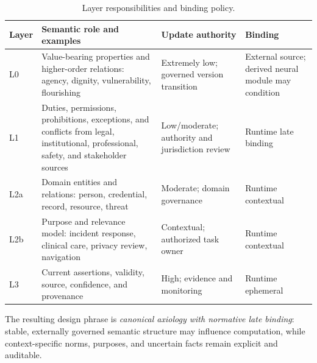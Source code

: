 \begin{table}[t]
\centering
\scriptsize
\caption{Layer responsibilities and binding policy.}
\label{tab:layers}
\renewcommand{\arraystretch}{1.15}
\setlength{\tabcolsep}{3pt}
\begin{tabularx}{\linewidth}{@{}>{\raggedright\arraybackslash}p{0.85cm}>{\raggedright\arraybackslash}X>{\raggedright\arraybackslash}p{2.1cm}>{\raggedright\arraybackslash}p{1.65cm}@{}}
\toprule
Layer & Semantic role and examples & Update authority & Binding \\
\midrule
L0 & Value-bearing properties and higher-order relations: agency, dignity, vulnerability, flourishing & Extremely low; governed version transition & External source; derived neural module may condition \\
L1 & Duties, permissions, prohibitions, exceptions, and conflicts from legal, institutional, professional, safety, and stakeholder sources & Low/moderate; authority and jurisdiction review & Runtime late binding \\
L2a & Domain entities and relations: person, credential, record, resource, threat & Moderate; domain governance & Runtime contextual \\
L2b & Purpose and relevance model: incident response, clinical care, privacy review, navigation & Contextual; authorized task owner & Runtime contextual \\
L3 & Current assertions, validity, source, confidence, and provenance & High; evidence and monitoring & Runtime ephemeral \\
\bottomrule
\end{tabularx}
\end{table}

The resulting design phrase is \emph{canonical axiology with normative late binding}: stable, externally governed semantic structure may influence computation, while context-specific norms, purposes, and uncertain facts remain explicit and auditable.
